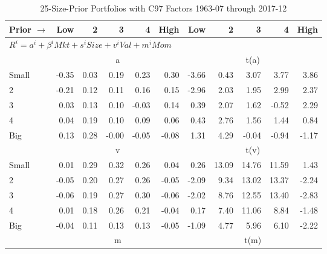 
\begin{table}[!ht]
\footnotesize
\centering
\caption{25-Size-Prior Portfolios with C97 Factors 1963-07 through 2017-12}
\begin{tabular}{lrrrrrrrrrr}
  \toprule
    Prior $\rightarrow$ & Low & 2 & 3 & 4 & High & Low & 2 & 3 & 4 & High \\ 
  \midrule
  \multicolumn{11}{l}{$R^i=a^i+\beta^iMkt+s^iSize+v^iVal+m^iMom$} \\

  
    
      & \multicolumn{5}{c}{a} & \multicolumn{5}{c}{t(a)}
    
    \\
      \cmidrule(r){2-6} \cmidrule(r){7-11}

    Small   & -0.35  & 0.03  & 0.19  & 0.23  & 0.30  & -3.66  & 0.43  & 3.07  & 3.77  & 3.86  \\
         2  & -0.21  & 0.12  & 0.11  & 0.16  & 0.15  & -2.96  & 2.03  & 1.95  & 2.99  & 2.37  \\
         3  & 0.03  & 0.13  & 0.10  & -0.03  & 0.14  & 0.39  & 2.07  & 1.62  & -0.52  & 2.29  \\
         4  & 0.04  & 0.19  & 0.10  & 0.09  & 0.06  & 0.43  & 2.76  & 1.56  & 1.44  & 0.84  \\
    Big     & 0.13  & 0.28  & -0.00  & -0.05  & -0.08  & 1.31  & 4.29  & -0.04  & -0.94  & -1.17  \\

  
    
      & \multicolumn{5}{c}{v} & \multicolumn{5}{c}{t(v)}
    
    \\
      \cmidrule(r){2-6} \cmidrule(r){7-11}

    Small   & 0.01  & 0.29  & 0.32  & 0.26  & 0.04  & 0.26  & 13.09  & 14.76  & 11.59  & 1.43  \\
         2  & -0.05  & 0.20  & 0.27  & 0.26  & -0.05  & -2.09  & 9.34  & 13.02  & 13.37  & -2.24  \\
         3  & -0.06  & 0.19  & 0.27  & 0.30  & -0.06  & -2.02  & 8.76  & 12.55  & 13.40  & -2.83  \\
         4  & 0.01  & 0.18  & 0.26  & 0.21  & -0.04  & 0.17  & 7.40  & 11.06  & 8.84  & -1.48  \\
    Big     & -0.04  & 0.11  & 0.13  & 0.13  & -0.05  & -1.09  & 4.77  & 5.96  & 6.10  & -2.22  \\

  
    
      & \multicolumn{5}{c}{m} & \multicolumn{5}{c}{t(m)}
    

\end{tabular}
\end{table}
